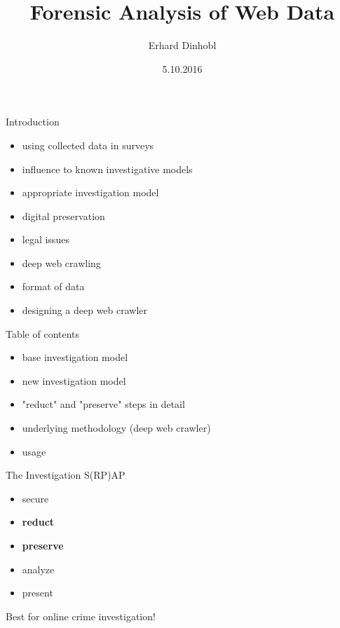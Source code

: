 \documentclass{beamer}
\title[]{Forensic Analysis of Web Data}
\author{Erhard Dinhobl}
\institute{Vienna University of Technology - Information and Software Engineering Group}
\date{5.10.2016}
\begin{document}
\begin{frame}
  \titlepage
\end{frame}


\begin{frame}{Introduction}

\begin{itemize}
  \item using collected data in surveys
  \item influence to known investigative models
  \item appropriate investigation model
  \item digital preservation
  \item legal issues
  \item deep web crawling
  \item format of data
  \item designing a deep web crawler
\end{itemize}

\end{frame}

\begin{frame}{Table of contents}

\begin{itemize}
  \item base investigation model
  \item new investigation model
  \item "reduct" and "preserve" steps in detail
  \item underlying methodology (deep web crawler)
  \item usage
\end{itemize}
\end{frame}


\begin{frame}{The Investigation S(RP)AP}
\begin{itemize}
  \item secure
  \item \textbf{reduct}
  \item \textbf{preserve}
  \item analyze
  \item present
\end{itemize}

Best for online crime investigation!

\end{frame}
\end{document}
